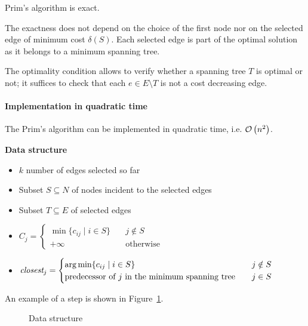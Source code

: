 \documentclass[english]{article}
\begin{document}
\begin{proposition}
  Prim's algorithm is exact.
\end{proposition}

The exactness does not depend on the choice of the first node nor on the selected edge of minimum cost \(\delta(S)\).
Each selected edge is part of the optimal solution as it belongs to a minimum spanning tree.

The optimality condition allows to verify whether a spanning tree \(T\) is optimal or not;
it suffices to check that each \(e \in E \setminus T\) is not a cost decreasing edge.

\paragraph{Implementation in quadratic time}

The Prim's algorithm can be implemented in quadratic time, i.e. \(\mathcal{O}\left(n^2\right)\).

\textbf{Data structure}
\begin{itemize}[itemsep=0.25ex]
  \item \(k\) number of edges selected so far
  \item Subset \(S \subseteq N\) of nodes incident to the selected edges
  \item Subset \(T \subseteq E\) of selected edges
  \item \(C_j = \begin{cases} \min \{c_{ij} \mid   i \in S\} \quad &j \notin S \\ +\infty &\text{otherwise}\end{cases}\)
  \item \(\textit{closest}_j = \begin{cases} \operatorname*{arg\,min}\{c_{ij} \mid   i \in S\}  & j \notin S \\ \text{predecessor of } j \text{ in the minimum spanning tree} \quad& j \in S \end{cases}\)
\end{itemize}

\bigskip
An example of a step is shown in Figure~\ref{fig:prim-quadratic-data-structure}.

\begin{figure}[htbp]
  \centering
  \bigskip
  \centering
  \caption{Data structure}
  \label{fig:prim-quadratic-data-structure}
  \bigskip
\end{figure}
\end{document}
